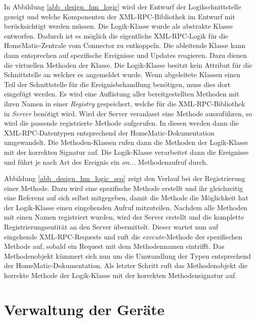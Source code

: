 In Abbildung \ref{abb_design_hm_logic} wird der Entwurf der Logikschnittstelle gezeigt und welche
Komponenten der XML-RPC-Bibliothek im Entwurf mit berücksichtigt werden müssen.
Die Logik-Klasse wurde als abstrakte Klasse entworfen.
Dadurch ist es möglich die eigentliche XML-RPC-Logik für die HomeMatic-Zentrale vom Connector
zu entkoppeln.
Die ableitende Klasse kann dann entsprechen auf spezifische Ereignisse und Updates reagieren.
Dazu dienen die virtuellen Methoden der Klasse.
Die Logik-Klasse besitzt kein Attribut für die Schnittstelle an welcher es angemeldet wurde.
Wenn abgeleitete Klassen einen Teil der Schnittstelle für die Ereignisbehandlung benötigen,
muss dies dort eingefügt werden.
Es wird eine Auflistung aller bereitgestellten Methoden mit ihren Namen in einer \emph{Registry} gespeichert,
welche für die XML-RPC-Bibliothek in \emph{Server} benötigt wird.
Wird der Server veranlasst eine Methode auszuführen, so wird die passende registrierte Methode
aufgerufen.
In diesen werden dann die XML-RPC-Datentypen entsprechend der HomeMatic-Dokumentation umgewandelt.
Die Methoden-Klassen rufen dann die Methoden der Logik-Klasse mit der korrekten Signatur auf.
Die Logik-Klasse verarbeitet dann die Ereignisse und führt je nach Art des Ereignis ein \emph{on...}
Methodenaufruf durch.



Abbildung \ref{abb_design_hm_logic_seq} zeigt den Verlauf bei der Registrierung einer Methode.
Dazu wird eine spezifische Methode erstellt und ihr gleichzeitig eine Referenz auf
sich selbst mitgegeben, damit die Methode die Möglichkeit hat der Logik-Klasse einen
eingehenden Aufruf mitzuteilen.
Nachdem alle Methoden mit einen Namen registriert wurden, wird der Server erstellt und die komplette
Registrierungsentität an den Server übermittelt.
Dieser wartet nun auf eingehende XML-RPC-Requests und ruft die \emph{execute}-Methode der spezifischen
Methode auf, sobald ein Request mit dem Methodennamen eintrifft.
Das Methodenobjekt kümmert sich nun um die Umwandlung der Typen entsprechend der HomeMatic-Dokumentation.
Als letzter Schritt ruft das Methodenobjekt die korrekte Methode der Logik-Klasse mit der korrekten
Methodensignatur auf.

\section{Verwaltung der Geräte}
\label{design_geverw}

